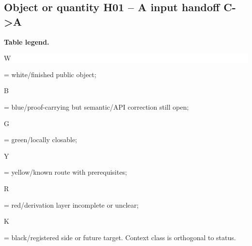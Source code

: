 \subsection*{Object or quantity H01 -- A input handoff C->A}
\hypertarget{objproof:H01}{}
\par\smallskip\noindent\begin{minipage}{0.99\linewidth}\footnotesize\raggedright\textbf{Table legend.} \colorbox{white}{\strut W} = white/finished public object; \colorbox{cyan!20}{\strut B} = blue/proof-carrying but semantic/API correction still open; \colorbox{green!18}{\strut G} = green/locally closable; \colorbox{yellow!25}{\strut Y} = yellow/known route with prerequisites; \colorbox{red!20}{\strut R} = red/derivation layer incomplete or unclear; \colorbox{black!18}{\strut K} = black/registered side or future target. Context class is orthogonal to status.\end{minipage}\par\vspace{0.25em}
